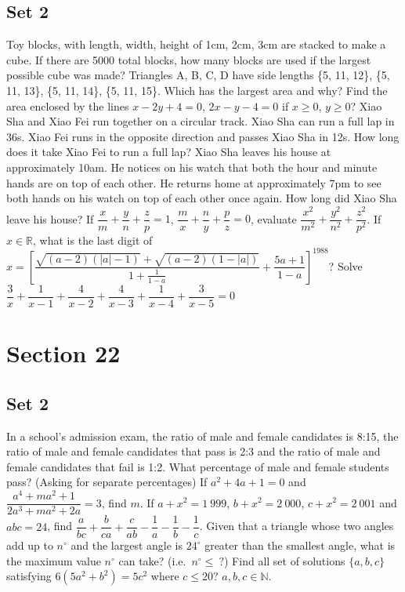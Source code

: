 \documentclass[11pt,a4paper,twoside,UTF8]{exam}
\begin{document}
\subsection*{Set 2}
\begin{questions}
	\question
	Toy blocks, with length, width, height of 1cm, 2cm, 3cm are stacked to make a cube. If there are 5000 total blocks, how many blocks are used if the largest possible cube was made?
	\question
	Triangles A, B, C, D have side lengths \{5, 11, 12\}, \{5, 11, 13\}, \{5, 11, 14\}, \{5, 11, 15\}. Which has the largest area and why?
	\question
	Find the area enclosed by the lines $x - 2y + 4 = 0$, $2x - y - 4 = 0$ if $x \geq 0$, $y \geq 0$?
	\question
	Xiao Sha and Xiao Fei run together on a circular track. Xiao Sha can run a full lap in 36s. Xiao Fei runs in the opposite direction and passes Xiao Sha in 12s. How long does it take Xiao Fei to run a full lap?
	\question
	Xiao Sha leaves his house at approximately 10am. He notices on his watch that both the hour and minute hands are on top of each other. He returns home at approximately 7pm to see both hands on his watch on top of each other once again. How long did Xiao Sha leave his house?
	\setcounter{question}{8}
	\question
	If $\dfrac{x}{m} + \dfrac{y}{n} + \dfrac{z}{p} = 1$, $\dfrac{m}{x} + \dfrac{n}{y} + \dfrac{p}{z} = 0$, evaluate $\dfrac{x^2}{m^2} + \dfrac{y^2}{n^2} + \dfrac{z^2}{p^2}$.
	\setcounter{question}{12}
	\question
	If $x \in \mathbb{R}$, what is the last digit of $x = \left[\dfrac{\sqrt{(a - 2)(|a| - 1)} + \sqrt{(a - 2)(1 - |a|)}}{1 + \frac{1}{1 - a}} + \dfrac{5a + 1}{1 - a}\right]^{1988}$?
	\question
	Solve $\dfrac{3}{x} + \dfrac{1}{x - 1} + \dfrac{4}{x - 2} + \dfrac{4}{x - 3} + \dfrac{1}{x - 4} + \dfrac{3}{x - 5} = 0$
\end{questions}
\section*{Section 22}
\subsection*{Set 2}
\begin{questions}
	\setcounter{question}{1}
	\question
	In a school's admission exam, the ratio of male and female candidates is 8:15, the ratio of male and female candidates that pass is 2:3 and the ratio of male and female candidates that fail is 1:2. What percentage of male and female students pass? (Asking for separate percentages)
	\setcounter{question}{7}
	\question
	If $a^2 + 4a + 1 = 0$ and $\dfrac{a^4 + ma^2 + 1}{2a^3 + ma^2 + 2a} = 3$, find $m$.
	\setcounter{question}{9}
	\question
	If $a + x^2 = 1\ 999$, $b + x^2 = 2\ 000$, $c+ x^2 = 2\ 001$ and $abc = 24$, find $\dfrac{a}{bc} + \dfrac{b}{ca} + \dfrac{c}{ab} - \dfrac{1}{a} - \dfrac{1}{b} - \dfrac{1}{c}$.
	\setcounter{question}{11}
	\question
	Given that a triangle whose two angles add up to $n^\circ$ and the largest angle is $24^\circ$ greater than the smallest angle, what is the maximum value $n^\circ$ can take? (i.e.\ $n^\circ \leq\ ?$)
	\setcounter{question}{14}
	\question
	Find all set of solutions $\{a, b, c\}$ satisfying $6(5a^2 + b^2) = 5c^2$ where $c \leq 20$? $a, b, c \in \mathbb{N}$.
\end{questions}
\end{document}
